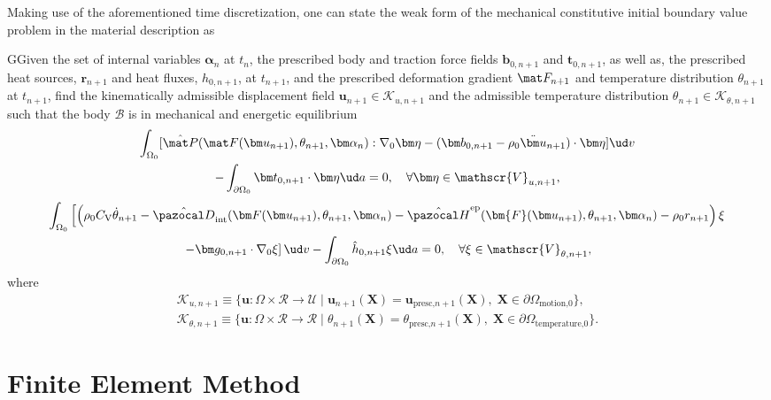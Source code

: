 Making use of the aforementioned time discretization, one can state the weak form of the mechanical constitutive initial boundary value problem in the material description as
\begin{problem}
    GGiven the set of internal variables $\bm \alpha_n$ at $t_n$, the prescribed body and traction force fields $\bm b_{0,n+1}$ and $\bm t_{0,n+1}$, as well as, the prescribed heat sources, \(\bm r_{n+1}\) and heat fluxes, \(h_{0,n+1}\), at $t_{n+1}$, and the prescribed deformation gradient $\mat F_{n+1}$ and temperature distribution \(\theta_{n+1}\) at $t_{n+1}$, find the kinematically admissible displacement field $\bm u_{n+1}\in\mathscr{K}_{u,n+1}$ and the admissible temperature distribution \(\theta_{n+1}\in\mathscr K_{\theta,n+1}\) such that the body $\mathscr{B}$ is in mechanical and energetic equilibrium
            \begin{multline}
        \int_{\Omega_0} [\hat{\mat P}(\mat F(\bm u_{n+1}), \theta_{n+1}, \bm \alpha_n):\nabla_0 \bm \eta - (\bm b_{0,n+1}-\rho_0\ddot{\bm u}_{n+1})\cdot \bm \eta]\ud v\\ - \int_{\partial\Omega_0} \bm t_{0,n+1}\cdot \bm \eta\ud a = 0,\quad \forall \bm \eta \in \mathscr{V}_{u,n+1},
        \end{multline}
        \begin{multline}
        \int_{\Omega_0}   \left[\left(\rho_0C_\mathrm{V}\dot\theta_{n+1} -\hat{\pazocal D}_\text{int}(\bm F(\bm u_{n+1}), \theta_{n+1}, \bm \alpha_n) - \hat{\pazocal H}^\text{ep}(\bm{F}(\bm u_{n+1}), \theta_{n+1}, \bm \alpha_n)- \rho_0 r_{n+1} \right) \xi\right.\\
        \left. - \bm g_{0,n+1}\cdot \nabla_0 \xi\right]\ud v - \int_{\partial\Omega_0} \hat h_{0,n+1} \xi\ud a = 0,\quad \forall \xi \in \mathscr{V}_{\theta,n+1},
    \end{multline}
    where
    \begin{gather}
            \mathscr{K}_{u,n+1}\equiv \{\bm u:\Omega\times \mathscr{R}\to \mathscr{U}\;|\;\bm u_{n+1}(\bm X) = \bm u_\text{presc,$n+1$}(\bm X),\;\bm X\in\partial \Omega_\text{motion,0}\},\\
            \mathscr{K}_{\theta, n+1}\equiv \{\bm u:\Omega\times \mathscr{R}\to \mathscr{R}\;|\;\theta_{n+1}(\bm X) = \theta_\text{presc,$n+1$}(\bm X),\;\bm X\in\partial \Omega_\text{temperature,0}\}.
    \end{gather}
\end{problem}

\section{Finite Element Method} \label{sec:fem_mech}

